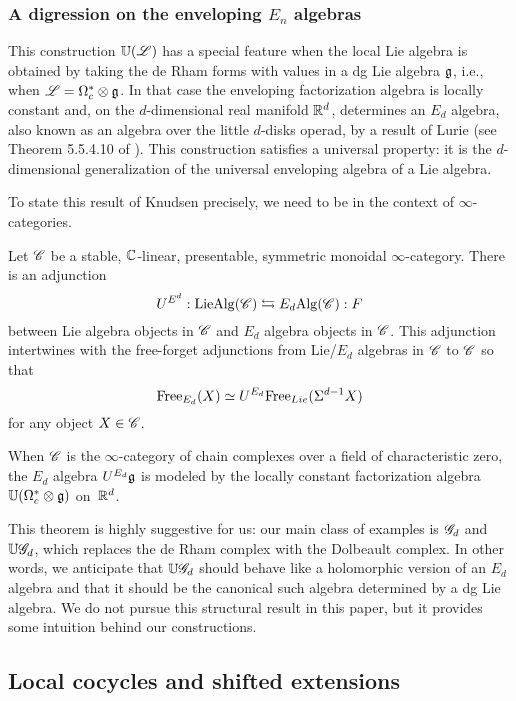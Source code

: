 \subsubsection{A digression on the enveloping $E_n$ algebras}
\label{sec:knudsen}

This construction $\mathbb U(\mathscr L)$ has a special feature when the local Lie algebra is obtained by taking the de Rham forms with values in a dg Lie algebra $\mathfrak g$, i.e., when $\mathscr L = \Omega^*_c \otimes \mathfrak g$.
In that case the enveloping factorization algebra is locally constant and, on the $d$-dimensional real manifold $\mathbb R^d$, determines an $E_d$ algebra, also known as an algebra over the little $d$-disks operad, by a result of Lurie (see Theorem 5.5.4.10 of \cite{LurieHA}).
This construction satisfies a universal property: 
it is the $d$-dimensional generalization of the universal enveloping algebra of a Lie algebra.

To state this result of Knudsen precisely, we need to be in the context of $\infty$-categories.

\begin{thm} 
\label{thm:knudsen}
Let $\mathscr C$ be a stable, $\mathbb C$-linear, presentable, symmetric monoidal $\infty$-category.
There is an adjunction
\[
U^{E^d} : {\rm LieAlg}(\mathscr C) \leftrightarrows E_d{\rm Alg} (\mathscr C): F
\]
between Lie algebra objects in $\mathscr C$ and $E_d$ algebra objects in $\mathscr C$.
This adjunction intertwines with the free-forget adjunctions from Lie/$E_d$ algebras in $\mathscr C$ to $\mathscr C$ 
so that 
\[
{\rm Free}_{E_d}(X) \simeq U^{E_d} {\rm Free}_{Lie}(\Sigma^{d-1} X)
\]
for any object $X \in \mathscr C$. 

When $\mathscr C$ is the $\infty$-category of chain complexes over a field of characteristic zero,
the $E_d$ algebra $U^{E_d} \mathfrak g$ is modeled by the locally constant factorization algebra $\mathbb U(\Omega^*_c \otimes \mathfrak g)$ on~$\mathbb R^d$.
\end{thm}

This theorem is highly suggestive for us:
our main class of examples is $\mathscr G_d$ and $\mathbb U \mathscr G_d$,
which replaces the de Rham complex with the Dolbeault complex.
In other words, we anticipate that $\mathbb U \mathscr G_d$ should behave like a holomorphic version of an $E_d$ algebra
and that it should be the canonical such algebra determined by a dg Lie algebra.
We do not pursue this structural result in this paper,
but it provides some intuition behind our constructions.

\subsection{Local cocycles and shifted extensions}

